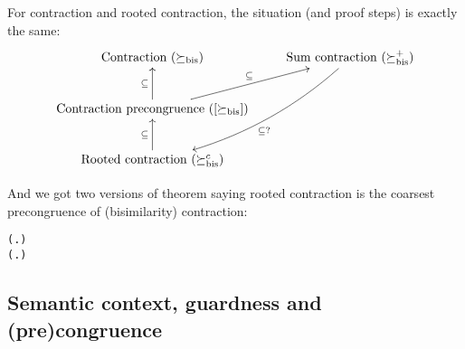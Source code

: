 For contraction and rooted contraction, the situation (and proof
steps) is exactly the same:
\begin{displaymath}
\xymatrix{
{\textrm{Contraction } (\succeq_{\mathrm{bis}})} & {\textrm{Sum
    contraction } (\succeq_{\mathrm{bis}}^+)} \ar@/^3ex/[ldd]^{\subseteq ?}\\
{\textrm{Contraction precongruence } ([\succeq_{\mathrm{bis}}])}
\ar[u]^{\subseteq} \ar[ru]^{\subseteq} \\
{\textrm{Rooted contraction } (\succeq_{\mathrm{bis}}^c)} \ar[u]^{\subseteq}
}
\end{displaymath}

And we got two versions of theorem saying rooted contraction is the
coarsest precongruence of (bisimilarity) contraction:
\begin{alltt}
\HOLTokenTurnstile{}   \HOLSymConst{\HOLTokenConj{}}   \HOLSymConst{\HOLTokenImp{}}
   ( \HOLSymConst{\HOLTokenObsContracts}  \HOLSymConst{\HOLTokenEquiv{}} \HOLSymConst{\HOLTokenForall{}}.  \HOLSymConst{+}  \HOLSymConst{\HOLTokenContracts{}}  \HOLSymConst{+} )
\HOLTokenTurnstile{}   \HOLSymConst{\HOLTokenConj{}}   \HOLSymConst{\HOLTokenImp{}}
   ( \HOLSymConst{\HOLTokenObsContracts}  \HOLSymConst{\HOLTokenEquiv{}} \HOLSymConst{\HOLTokenForall{}}.  \HOLSymConst{+}  \HOLSymConst{\HOLTokenContracts{}}  \HOLSymConst{+} )
\end{alltt}

\subsection{Semantic context, guardness and (pre)congruence}

